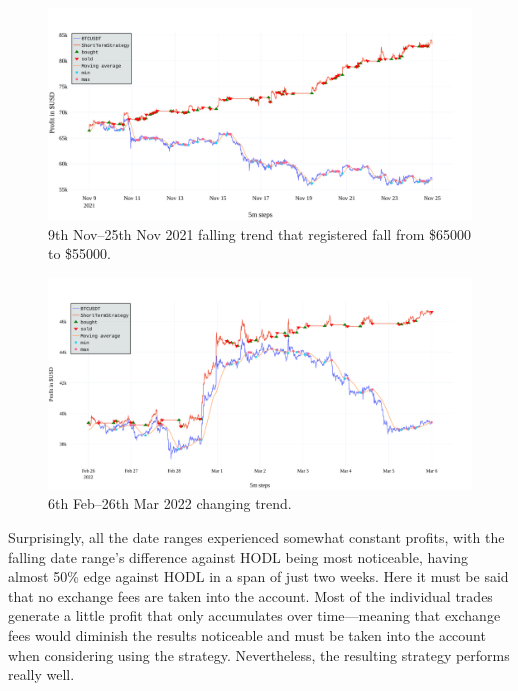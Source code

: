 \begin{figure}[!hbt]
    \centering
    \includegraphics[width=\columnwidth]{figures/short-term-falling.pdf}
    \caption{9th Nov--25th Nov 2021 falling trend that registered fall from \$65000 to \$55000.}
    \label{figure-short-term-falling}
\end{figure}

\begin{figure}[!hbt]
    \centering
    \includegraphics[width=\columnwidth]{figures/short-term-changing.pdf}
    \caption{6th Feb--26th Mar 2022 changing trend.}
    \label{figure-short-term-changing}
\end{figure}

Surprisingly, all the date ranges experienced somewhat constant profits, with the falling date range's difference against HODL being most noticeable, having almost 50\% edge against HODL in a span of just two weeks. Here it must be said that no exchange fees are taken into the account. Most of the individual trades generate a little profit that only accumulates over time---meaning that exchange fees would diminish the results noticeable and must be taken into the account when considering using the strategy. Nevertheless, the resulting strategy performs really well.

